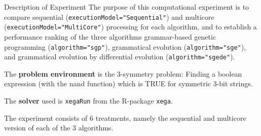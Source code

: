 \begin{frame}
\vspace*{2mm}
\begin{block}{
Description of Experiment
}
The purpose of this computational experiment is
to compare sequential ({\tt executionModel="Sequential"})
and multicore ({\tt executionModel="MultiCore"}) processing
for each algorithm,
and to establish a performance ranking of the three algorithms
grammar-based genetic programming ({\tt algorithm="sgp"}),
grammatical evolution ({\tt algorithm="sge"}), and
grammatical evolution by differential evolution ({\tt algorithm="sgede"}).
 
The {\bf problem environment} is the 3-symmetry problem:
Finding a boolean expression (with the nand function)
which is TRUE for symmetric 3-bit strings.
 
The {\bf solver} used is {\tt xegaRun} from the R-package {\tt xega}.
 
The experiment consists of 6 treatments, namely the sequential and
multicore version of each of the 3 algorithms.
\end{block}
\end{frame}